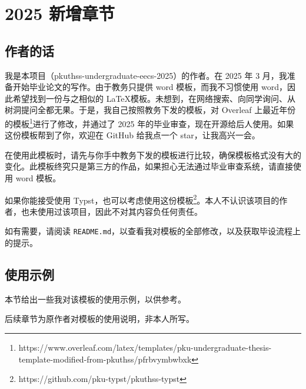 
\chapter{2025 新增章节}
\label{chap:new-chapter}

\section{作者的话}

我是本项目（pkuthss-undergraduate-eecs-2025）的作者。在 2025 年 3 月，我准备开始毕业论文的写作。由于教务只提供 word 模板，而我不习惯使用 word，因此希望找到一份与之相似的 \LaTeX 模板。未想到，在网络搜索、向同学询问、从树洞提问全都无果。于是，我自己按照教务下发的模板，对 Overleaf 上最近年份的模板\footnote{https://www.overleaf.com/latex/templates/pku-undergraduate-thesis-template-modified-from-pkuthss/pfrbvymbwbxk}进行了修改，并通过了 2025 年的毕业审查，现在开源给后人使用。如果这份模板帮到了你，欢迎在 GitHub 给我点一个 star，让我高兴一会。

在使用此模板时，请先与你手中教务下发的模板进行比较，确保模板格式没有大的变化。此模板终究只是第三方的作品，如果担心无法通过毕业审查系统，请直接使用 word 模板。

如果你能接受使用 Typst，也可以考虑使用这份模板\footnote{https://github.com/pku-typst/pkuthss-typst}。本人不认识该项目的作者，也未使用过该项目，因此不对其内容负任何责任。

如有需要，请阅读 \texttt{README.md}，以查看我对模板的全部修改，以及获取毕设流程上的提示。

\section{使用示例}

本节给出一些我对该模板的使用示例，以供参考。

后续章节为原作者对模板的使用说明，非本人所写。
